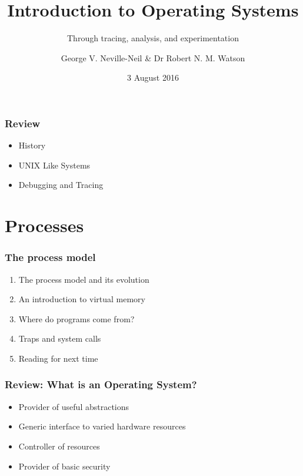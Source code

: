 \documentclass[pdftex]{beamer} %
\begin{document}

\title{Introduction to Operating Systems}
\subtitle{Through tracing, analysis, and experimentation}
\author{George V. Neville-Neil \& Dr Robert N. M. Watson}
\date{3 August 2016}

\begin{frame}
  \titlepage
\end{frame}

\begin{frame}
  \frametitle{Review}
  \begin{itemize}
  \item History
  \item UNIX Like Systems
  \item Debugging and Tracing
  \end{itemize}
\end{frame}

\section{Processes}
\label{sec:processes}

\begin{frame}
  \frametitle{The process model}

  \begin{enumerate}
    \item The process model and its evolution
    \item An introduction to virtual memory
    \item Where do programs come from?
    \item Traps and system calls
    \item Reading for next time
  \end{enumerate}
\end{frame}

\begin{frame}
  \frametitle{Review: What is an Operating System?}
  \begin{itemize}
  \item Provider of useful abstractions
  \item Generic interface to varied hardware resources
  \item Controller of resources
  \item Provider of basic security
  \end{itemize}
\end{frame}
\end{document}
